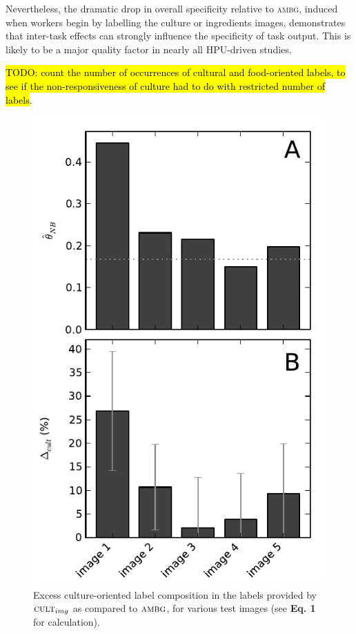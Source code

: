 \documentclass[a4paper]{report}
\newcommand{\td}[1]{{\color{blu}\hl{TODO: #1}}}
\begin{document}
Nevertheless, the dramatic drop in overall specificity relative to 
\textsc{ambg}, induced when workers begin by labelling the culture or 
ingredients images, demonstrates that 
inter-task effects can strongly influence the specificity of task output.
This is likely to be a major quality factor in nearly all HPU-driven studies.

\td{count the number of occurrences of cultural and food-oriented labels, 
	to see if the non-responsiveness of culture had to do with restricted
number of labels}.



\begin{figure}
	\includegraphics{figs/longitudinal_theta_excess-culture.pdf}
	\caption{Excess culture-oriented label composition in the labels provided
		by $\textsc{cult}_{img}$ as compared to $\textsc{ambg}$, for various
		test images (see \textbf{Eq. 1} for calculation).
	}
\end{figure}
\end{document}
